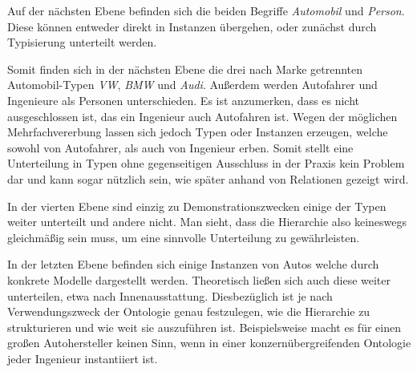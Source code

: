 \documentclass[12pt]{report}
\begin{document}
Auf der nächsten Ebene befinden sich die beiden Begriffe \textit{Automobil} und \textit{Person}. Diese können entweder direkt in Instanzen übergehen, oder zunächst durch Typisierung unterteilt werden. 

Somit finden sich in der nächsten Ebene die drei nach Marke getrennten Automobil-Typen \textit{VW}, \textit{BMW} und \textit{Audi}. Außerdem werden Autofahrer und Ingenieure als Personen unterschieden. Es ist anzumerken, dass es nicht ausgeschlossen ist, das ein Ingenieur auch Autofahren ist. Wegen der möglichen Mehrfachvererbung lassen sich jedoch Typen oder Instanzen erzeugen, welche sowohl von Autofahrer, als auch von Ingenieur erben. Somit stellt eine Unterteilung in Typen ohne gegenseitigen Ausschluss in der Praxis kein Problem dar und kann sogar nützlich sein, wie später anhand von Relationen gezeigt wird. 

In der vierten Ebene sind einzig zu Demonstrationszwecken einige der Typen weiter unterteilt und andere nicht. Man sieht, dass die Hierarchie also keineswegs gleichmäßig sein muss, um eine sinnvolle Unterteilung zu gewährleisten. 

In der letzten Ebene befinden sich einige Instanzen von Autos welche durch konkrete Modelle dargestellt werden. Theoretisch ließen sich auch diese weiter unterteilen, etwa nach Innenausstattung. Diesbezüglich ist je nach Verwendungszweck der Ontologie genau festzulegen, wie die Hierarchie zu strukturieren und wie weit sie auszuführen ist. Beispielsweise macht es für einen großen Autohersteller keinen Sinn, wenn in einer konzernübergreifenden Ontologie jeder Ingenieur instantiiert ist.
\end{document}
